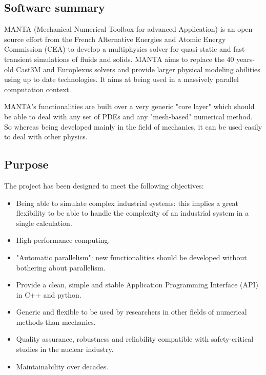 \subsection{Software summary}
\label{sec:MANTA:summary}

MANTA (Mechanical Numerical Toolbox for advanced Application) is an open-source
effort from the French Alternative Energies and Atomic Energy Commission (CEA) to develop a
multiphysics solver for quasi-static and fast-transient simulations of fluids and solids. MANTA aims
to replace the 40 years-old Cast3M and Europlexus solvers and provide larger physical modeling
abilities using up to date technologies. It aims at being used in a massively parallel computation context.

MANTA's functionalities are built over a very generic "core layer" which should be able to deal 
with any set of PDEs and any "mesh-based" numerical method. So whereas being developed mainly in the 
field of mechanics, it can be used easily to deal with other physics.

\subsection{Purpose}
\label{sec:MANTA:purpose}

The project has been designed to meet the following objectives:
\begin{itemize}
    \item Being able to simulate complex industrial systems: this implies a great flexibility to be able to handle the complexity of an industrial system in a single calculation.
    \item High performance computing.
    \item "Automatic parallelism": new functionalities should be developed without bothering about parallelism.
    \item Provide a clean, simple and stable Application Programming Interface (API) in C++ and python.
    \item Generic and flexible to be used by researchers in other fields of numerical methods than mechanics.
    \item Quality assurance, robustness and reliability compatible with safety-critical studies in the
nuclear industry.
    \item Maintainability over decades.
\end{itemize}

